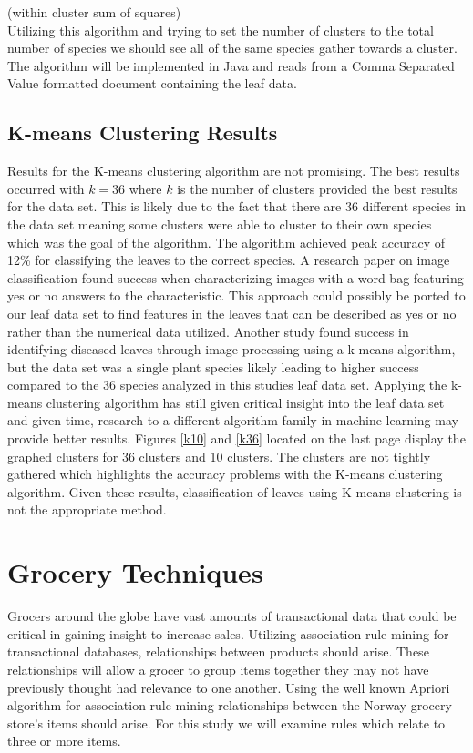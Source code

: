 \documentclass[times, 12pt,twocolumn]{article}
\begin{document}
(within cluster sum of squares) \\
Utilizing this algorithm and trying to set the number of clusters to the total number of species we should see all of the same species
gather towards a cluster. The algorithm will be implemented in Java and reads from a Comma Separated Value formatted document containing the
leaf data.

\subsection{K-means Clustering Results}
Results for the K-means clustering algorithm are not promising. The best results occurred with $k=36$ where $k$ is the number of clusters provided the best results for the data set. This is likely due to the fact that there are 36 different species in the data set meaning some clusters were able to cluster to their own species which was the
goal of the algorithm. The algorithm achieved peak accuracy of 12\% for classifying the leaves to the correct species. A research paper on image classification found success when characterizing images with a word bag featuring yes or no answers to the characteristic. This approach could possibly be ported to our leaf data set to find features in the leaves that can be described as yes or no rather than the numerical data utilized.\cite{Art1} Another study found success in identifying diseased leaves through image processing using a k-means algorithm, but the data set was a single plant species likely leading to higher success compared to the 36 species analyzed in this studies leaf data set.\cite{Art2} Applying the k-means clustering algorithm has still given critical insight into the leaf data set and given time, research to a different algorithm family in machine learning may provide better results. Figures \ref{k10} and \ref{k36} located on the last page display the graphed clusters for 36 clusters and 10 clusters. The clusters are not tightly gathered which highlights the accuracy problems with the K-means clustering algorithm. Given these results, classification of leaves using K-means clustering is not the appropriate method.

\section{Grocery Techniques}
Grocers around the globe have vast amounts of transactional data that could be critical in gaining insight to increase sales. Utilizing association rule mining for transactional
databases, relationships between products should arise. These relationships will allow a grocer to group items together they may not have previously thought had relevance to one another.
Using the well known Apriori algorithm for association rule mining relationships between the Norway grocery store's items should arise. For this study we will examine rules which relate
to three or more items.
\end{document}
